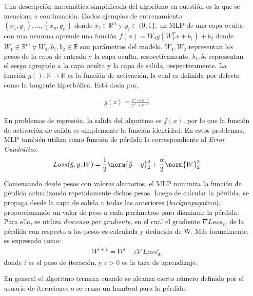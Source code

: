     \par Una descripción matemática simplificada del algoritmo en cuestión es la
      que se menciona a continuación.
      Dados ejemplos de entrenamiento $(x_{1}, y_{1}), \dots, (x_{n}, y_{n})$
      donde $x_{i} \in \mathbb{R}^{n}$ y $y_{i} \in \{0,1\}$, un MLP de una capa oculta
      con una neurona aprende una función $f(x) = W_{2}g(W_{1}^{T} x + b_{1}) + b_{2}$
      donde $W_{1} \in \mathbb{R}^{m}$ y $W_{2}, b_{1}, b_{2} \in \mathbb{R}$ son
      parámetros del modelo. $W_{1}, W_{2}$ representan los pesos de la capa de entrada y la
      capa oculta, respectivamente. $b_{1}, b_{2}$ representan el sesgo agregado a
      la capa oculta y la capa de salida, respectivamente. La función
      $g(): \mathbb{R} \rightarrow \mathbb{R}$ es la función de activación, la cual
      es definida por defecto como la tangente hiperbólica. Está dada por,

      \begin{align}
        g(z) = \frac{e^{z} - e^{-z}}{e^{z} + e^{-z}}
      \end{align}

      En problemas de regresión, la salida del algoritmo es $f(x)$, por lo que la
      función de activación de salida es simplemente la función identidad. En estos
      problemas, MLP también utiliza como función de pérdida la correspondiente
      al \textit{Error Cuadrático}:
      \begin{align}
        Loss(\hat{y}, y, W) = \frac{1}{2} \norm{\hat{y} - y}^{2}_{2} + \frac{\alpha}{2} \norm{W}^{2}_{2}
      \end{align}

    \par Comenzando desde pesos con valores aleatorios, el MLP minimiza la función de
      pérdida actualizando repetidamente dichos pesos. Luego de calcular la pérdida,
      se propaga desde la capa de salida a todas las anteriores (\textit{backpropagation}),
      proporcionando un valor de peso a cada parámetros para disminuir la pérdida.
      Para ello, se utiliza \textit{descenso por gradiente}, en el cual el
      gradiente $\nabla Loss_{W}$ de la pérdida con respecto a los pesos es
      calculada y deducida de W.
      Más formalmente, es expresado como:
      \begin{align}
        W^{i + 1} = W^{i} - \epsilon \nabla Loss^{i}_{W}
      \end{align}
      donde $i$ es el paso de iteración, y $\epsilon > 0$ es la taza de aprendizaje.

      En general el algoritmo termina cuando se alcanza cierto número definido por el
      usuario de iteraciones o se cruza un humbral para la pérdida.


